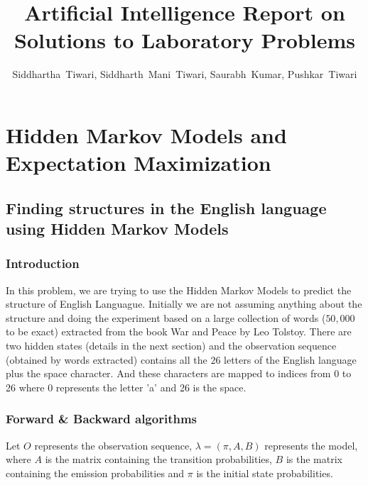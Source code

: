 \documentclass[journal, compsoc]{IEEEtran}
\title{Artificial Intelligence Report on Solutions to Laboratory Problems}
\author{Siddhartha~Tiwari, Siddharth~Mani~Tiwari, Saurabh~Kumar, Pushkar~Tiwari}
\begin{document}
\maketitle

\section{Hidden Markov Models and Expectation Maximization}
\subsection{Finding structures in the English language using Hidden Markov Models}
\subsubsection{Introduction}
In this problem, we are trying to use the Hidden Markov Models to predict the structure of English Languague. Initially we are not assuming anything about the structure and doing the experiment based
on a large collection of words ($50,000$ to be exact) extracted from the book War and Peace by Leo Tolstoy. There are two hidden states (details in the next section) and the observation sequence
(obtained by words extracted) contains all the $26$ letters of the English language plus the space character. And these characters are mapped to indices from 0 to 26 where 0 represents the letter 'a' and
26 is the space.
\subsubsection{Forward \& Backward algorithms}
Let $O$ represents the observation sequence, $\lambda = (\pi, A, B)$ represents the model, where $A$ is the matrix containing the transition probabilities, $B$ is the matrix containing the emission
probabilities and $\pi$ is the initial state probabilities.
\end{document}
